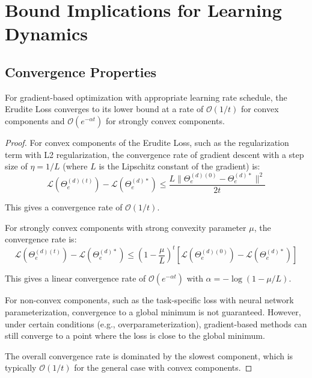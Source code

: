 \section{Bound Implications for Learning Dynamics}

\subsection{Convergence Properties}

\begin{theorem}
For gradient-based optimization with appropriate learning rate schedule, the Erudite Loss converges to its lower bound at a rate of $\mathcal{O}(1/t)$ for convex components and $\mathcal{O}(e^{-\alpha t})$ for strongly convex components.
\end{theorem}

\begin{proof}
For convex components of the Erudite Loss, such as the regularization term with L2 regularization, the convergence rate of gradient descent with a step size of $\eta = 1/L$ (where $L$ is the Lipschitz constant of the gradient) is:
\begin{equation}
\mathcal{L}(\Theta_e^{(d)(t)}) - \mathcal{L}(\Theta_e^{(d)*}) \leq \frac{L\|\Theta_e^{(d)(0)} - \Theta_e^{(d)*}\|^2}{2t}
\end{equation}

This gives a convergence rate of $\mathcal{O}(1/t)$.

For strongly convex components with strong convexity parameter $\mu$, the convergence rate is:
\begin{equation}
\mathcal{L}(\Theta_e^{(d)(t)}) - \mathcal{L}(\Theta_e^{(d)*}) \leq \left(1 - \frac{\mu}{L}\right)^t \left[\mathcal{L}(\Theta_e^{(d)(0)}) - \mathcal{L}(\Theta_e^{(d)*})\right]
\end{equation}

This gives a linear convergence rate of $\mathcal{O}(e^{-\alpha t})$ with $\alpha = -\log(1 - \mu/L)$.

For non-convex components, such as the task-specific loss with neural network parameterization, convergence to a global minimum is not guaranteed. However, under certain conditions (e.g., overparameterization), gradient-based methods can still converge to a point where the loss is close to the global minimum.

The overall convergence rate is dominated by the slowest component, which is typically $\mathcal{O}(1/t)$ for the general case with convex components.
\end{proof}

